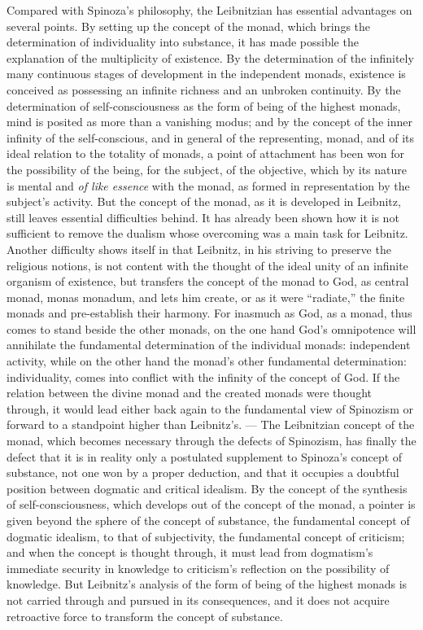 Compared with Spinoza's philosophy, the Leibnitzian has essential advantages on several points.
By setting up the concept of the monad, which brings the determination of individuality into
substance, it has made possible the explanation of the multiplicity of existence. By the
determination of the infinitely many continuous stages of development in the independent monads,
existence is conceived as possessing an infinite richness and an unbroken continuity. By the
determination of self-consciousness as the form of being of the highest monads, mind is posited as
more than a vanishing modus; and by the concept of the inner infinity of the self-conscious, and in
general of the representing, monad, and of its ideal relation to the totality of monads, a point of
attachment has been won for the possibility of the being, for the subject, of the objective, which
by its nature is mental and \emph{of like essence} with the monad, as formed in representation by
the subject's activity. But the concept of the monad, as it is developed in Leibnitz, still leaves
essential difficulties behind. It has already been shown how it is not sufficient to remove the
dualism whose overcoming was a main task for Leibnitz. Another difficulty shows itself in that
Leibnitz, in his striving to preserve the religious notions, is not content with the
thought of the ideal unity of an infinite organism of existence, but transfers the concept of the
monad to God, as central monad, monas monadum, and lets him create, or as it were ``radiate,'' the
finite monads and pre-establish their harmony. For inasmuch as God, as a monad, thus comes to stand
beside the other monads, on the one hand God's omnipotence will annihilate the fundamental
determination of the individual monads: independent activity, while on the other hand the monad's
other fundamental determination: individuality, comes into conflict with the infinity of the concept
of God. If the relation between the divine monad and the created monads were thought through, it
would lead either back again to the fundamental view of Spinozism or forward to a standpoint higher
than Leibnitz's. --- The Leibnitzian concept of the monad, which becomes necessary through the
defects of Spinozism, has finally the defect that it is in reality only a postulated supplement to
Spinoza's concept of substance, not one won by a proper deduction, and that it occupies a doubtful
position between dogmatic and critical idealism. By the concept of the synthesis of
self-consciousness, which develops out of the concept of the monad, a pointer is given beyond the
sphere of the concept of substance, the fundamental concept of dogmatic idealism, to that of
subjectivity, the fundamental concept of criticism; and when the concept is thought through, it must
lead from dogmatism's immediate security in knowledge to criticism's reflection on the possibility
of knowledge. But Leibnitz's analysis of the form of being of the highest monads is not carried
through and pursued in its consequences, and it does not acquire retroactive force to transform the
concept of substance.

